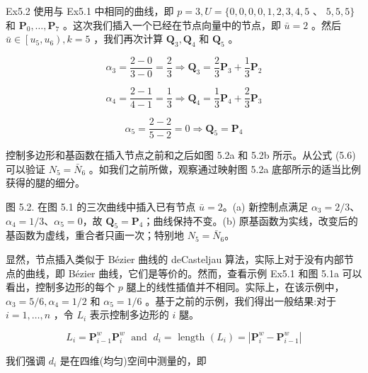 \documentclass[../main.tex]{subfiles}
\begin{document}
Ex5.2 使用与 Ex5.1 中相同的曲线，即 \(p = 3,U = \{ 0,0,0,0,1,2,3,4,5\) 、 \(5,5,5\}\) 和 \({\mathbf{P}}_{0},\ldots ,{\mathbf{P}}_{7}\) 。这次我们插入一个已经在节点向量中的节点，即 \(\bar{u} = 2\) 。然后 \(\bar{u} \in  \left\lbrack  {{u}_{5},{u}_{6}}\right) ,k = 5\) ，我们再次计算 \({\mathbf{Q}}_{3},{\mathbf{Q}}_{4}\) 和 \({\mathbf{Q}}_{5}\) 。

\[
{\alpha }_{3} = \frac{2 - 0}{3 - 0} = \frac{2}{3} \Rightarrow  {\mathbf{Q}}_{3} = \frac{2}{3}{\mathbf{P}}_{3} + \frac{1}{3}{\mathbf{P}}_{2}
\]

\[
{\alpha }_{4} = \frac{2 - 1}{4 - 1} = \frac{1}{3} \Rightarrow  {\mathbf{Q}}_{4} = \frac{1}{3}{\mathbf{P}}_{4} + \frac{2}{3}{\mathbf{P}}_{3}
\]

\[
{\alpha }_{5} = \frac{2 - 2}{5 - 2} = 0 \Rightarrow  {\mathbf{Q}}_{5} = {\mathbf{P}}_{4}
\]

控制多边形和基函数在插入节点之前和之后如图 5.2a 和 5.2b 所示。从公式 (5.6) 可以验证 \({N}_{5} = {\bar{N}}_{6}\) 。如我们之前所做，观察通过映射图 5.2a 底部所示的适当比例获得的腿的细分。



\begin{center}
\begin{minipage}{18cm}
\vspace*{.6\baselineskip}
\centering
{}
\par\smallskip
图 5.2. 在图 5.1 的三次曲线中插入已有节点 \(\bar u=2\)。(a) 新控制点满足 \(\alpha_3=2/3\)、\(\alpha_4=1/3\)、\(\alpha_5=0\)，故 \(\mathbf Q_5=\mathbf P_4\)；曲线保持不变。(b) 原基函数为实线，改变后的基函数为虚线，重合者只画一次；特别地 \(N_5=\bar N_6\)。
\end{minipage}
\end{center}

显然，节点插入类似于 Bézier 曲线的 deCasteljau 算法，实际上对于没有内部节点的曲线，即 Bézier 曲线，它们是等价的。然而，查看示例 Ex5.1 和图 5.1a 可以看出，控制多边形的每个 \(p\) 腿上的线性插值并不相同。实际上，在该示例中， \({\alpha }_{3} = 5/6,{\alpha }_{4} = 1/2\) 和 \({\alpha }_{5} = 1/6\) 。基于之前的示例，我们得出一般结果:对于 \(i = 1,\ldots ,n\) ，令 \({L}_{i}\) 表示控制多边形的 \(i\) 腿。

\[
{L}_{i} = {\mathbf{P}}_{i - 1}^{w}{\mathbf{P}}_{i}^{w}\;\text{ and }\;{d}_{i} = \text{ length }\left( {L}_{i}\right)  = \left| {{\mathbf{P}}_{i}^{w} - {\mathbf{P}}_{i - 1}^{w}}\right|
\]

我们强调 \({d}_{i}\) 是在四维(均匀)空间中测量的，即
\end{document}
